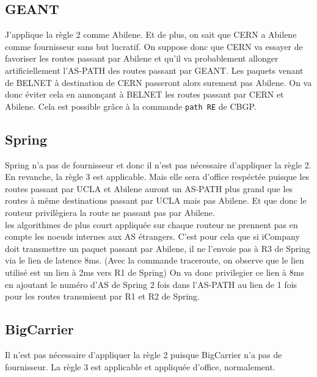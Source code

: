 \documentclass[a4paper, 12pt]{article}
\begin{document}
\subsection{GEANT}
J'applique la règle 2 comme Abilene.
Et de plus, on sait que CERN a Abilene comme fournisseur sans but lucratif. %
On suppose donc que CERN va essayer de favoriser les routes passant par Abilene et qu'il va probablement allonger artificiellement l'AS-PATH des routes passant par GEANT.
Les paquets venant de BELNET à destination de CERN passeront alors surement pas Abilene.
On va donc éviter cela en annonçant à BELNET les routes passant par CERN et Abilene.
Cela est possible grâce à la commande \texttt{path RE} de CBGP.

\subsection{Spring}
Spring n'a pas de fournisseur et donc il n'est pas nécessaire d'appliquer la règle 2.
\\

En revanche, la règle 3 est applicable.
Mais elle sera d'office respéctée puisque les routes passant par UCLA et Abilene auront un AS-PATH plus grand que les routes à même destinations passant par UCLA mais pas Abilene.
Et que donc le routeur privilègiera la route ne passant pas par Abilene.
\\

les algorithmes de plus court appliquée sur chaque routeur ne prennent pas en compte les noeuds internes aux AS étrangers.
C'est pour cela que si iCompany doit transmettre un paquet passant par Abilene, il ne l'envoie pas à R3 de Spring via le lien de latence 8ms.
(Avec la commande traceroute, on observe que le lien utilisé est un lien à 2ms vers R1 de Spring)
On va donc privilegier ce lien à 8ms en ajoutant le numéro d'AS de Spring 2 fois dans l'AS-PATH au lien de 1 fois pour les routes transmisent par R1 et R2 de Spring.

\subsection{BigCarrier}
Il n'est pas nécessaire d'appliquer la règle 2 puisque BigCarrier n'a pas de fournisseur.
La règle 3 est applicable et appliquée d'office, normalement.
\end{document}

